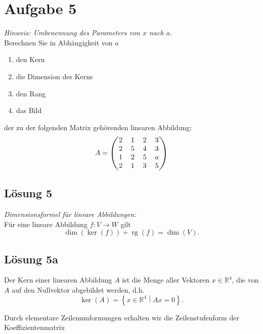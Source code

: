 \documentclass[main.tex]{subfiles}
\begin{document}
\section{Aufgabe 5}
\textit{Hinweis: Umbenennung des Parameters von $x$ nach $a$.}\\
Berechnen Sie in Abhängigkeit von $a$

\begin{enumerate}
    \item den Kern
    \item die Dimension des Kerns
    \item den Rang
    \item das Bild
\end{enumerate}
der zu der folgenden Matrix gehörenden linearen Abbildung:
$$
    \arraycolsep=0.6em
    A = \begin{pmatrix}
        2 & 1 & 2 & 3 \\
        2 & 5 & 4 & 3 \\
        1 & 2 & 5 & a \\
        2 & 1 & 3 & 5
    \end{pmatrix}
$$

\subsection{Lösung 5}
\textit{Dimensionsformel für lineare Abbildungen:}\\
Für eine lineare Abbildung $f: V \to W$ gilt
$$
    \dim (\ker (f)) + \operatorname{rg}(f) = \dim (V).
$$

\subsection{Lösung 5a}

Der Kern einer linearen Abbildung $A$ ist die Menge aller Vektoren $x \in \mathbb{R}^4$, die von $A$ auf den Nullvektor abgebildet werden, d.h.
$$
    \ker (A) = \left\{ x\in \mathbb{R}^4 \middle| Ax=0 \right\}.
$$

Durch elementare Zeilenumformungen erhalten wir die Zeilenstufenform der Koeffizientenmatrix
\end{document}
